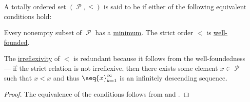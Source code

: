 \begin{definition}\label{def:well_ordered_set}
  A \hyperref[def:totally_ordered_set]{totally ordered set} \( (\mscrP, \leq) \) is said to be  if either of the following equivalent conditions hold:
  \begin{thmenum}
     Every nonempty subset of \( \mscrP \) has a \hyperref[def:poset_extremal_points/maximum_and_minimum]{minimum}.
     The strict order \( < \) is \hyperref[def:well_founded_relation]{well-founded}.
  \end{thmenum}

  The \hyperref[def:binary_relation/irreflexive]{irreflexivity} of \( < \) is redundant because it follows from the well-foundedness --- if the strict relation is not irreflexive, then there exists some element \( x \in \mscrP \) such that \( x < x \) and thus \( \seq{ x }_{k=1}^\infty \) is an infinitely descending sequence.
\end{definition}
\begin{proof}
  The equivalence of the conditions follows from  and .
\end{proof}

